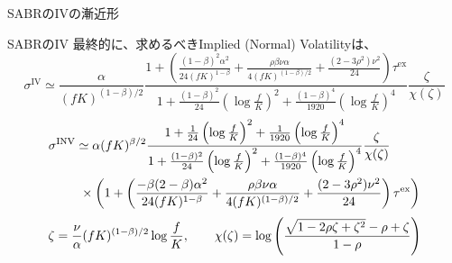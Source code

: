 \documentclass[dvipdfmx,9pt]{beamer}
\begin{document}
\begin{frame}{SABRのIVの漸近形}
  \begin{block}{SABRのIV}
    最終的に、求めるべきImplied (Normal) Volatilityは、
    \begin{equation}
      \sigma^{\mathrm{IV}} \simeq
      \frac{\alpha}{(fK)^{(1-\beta)/2}}
      \frac{1 + \left( \frac{(1-\beta)^{2}\alpha^{2}}{24(fK)^{1-\beta}}
        + \frac{\rho\beta\nu\alpha}{4(fK)^{(1-\beta)/2}}
        + \frac{(2-3\rho^{2})\nu^{2}}{24}\right)\tau^{\mathrm{ex}}}{1 + \frac{(1-\beta)^{2}}{24}
        \left(\log \frac{f}{K}\right)^{2}
        + \frac{(1-\beta)^{4}}{1920}\left(\log \frac{f}{K}\right)^{4}}
      \frac{\zeta}{\chi(\zeta)}
    \end{equation}
    \begin{equation}
      \begin{split}
        \sigma^{\mathrm{INV}} & \simeq
        \alpha(fK)^{\beta/2}
        \frac{1 + \frac{1}{24}
          \left(\log \frac{f}{K}\right)^{2}
          + \frac{1}{1920}\left(\log \frac{f}{K}\right)^{4}}{1 + \frac{(1-\beta)^{2}}{24}
          \left(\log \frac{f}{K}\right)^{2}
          + \frac{(1-\beta)^{4}}{1920}\left(\log \frac{f}{K}\right)^{4}}
        \frac{\zeta}{\chi(\zeta)} \\
        & ~\times \pqty{
          1 + \left( \frac{-\beta(2-\beta)\alpha^{2}}{24(fK)^{1-\beta}}
          + \frac{\rho\beta\nu\alpha}{4(fK)^{(1-\beta)/2}}
          + \frac{(2-3\rho^{2})\nu^{2}}{24}\right)\tau^{\mathrm{ex}}
        }
      \end{split}
    \end{equation}
    \begin{equation}
      \zeta = \frac{\nu}{\alpha}(fK)^{(1-\beta)/2}\log \frac{f}{K}, \qquad \chi(\zeta) = \log \pqty{ \frac{\sqrt{1 - 2\rho\zeta + \zeta^{2}} - \rho + \zeta}{1-\rho}}
    \end{equation}
  \end{block}
\end{frame}
\end{document}
